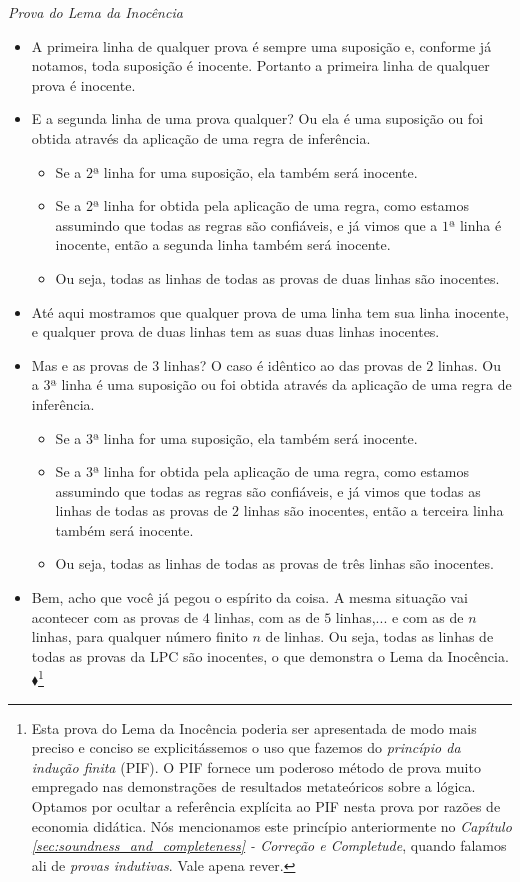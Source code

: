 	
\emph{Prova do Lema da Inocência}
\begin{itemize}
	\item A primeira linha de qualquer prova é sempre uma suposição e, conforme já notamos, toda suposição é inocente. Portanto a primeira linha de qualquer prova é inocente.
	\item E a segunda linha de uma prova qualquer? Ou ela é uma suposição ou foi obtida através da aplicação de uma regra de inferência.
		\begin{itemize} 
			\item Se a $2$ª linha for uma suposição, ela também será inocente.
			\item Se a $2$ª linha for obtida pela aplicação de uma regra, como estamos assumindo que todas as regras são confiáveis, e já vimos que a $1$ª linha é inocente, então a segunda linha também será inocente.
			\item Ou seja, todas as linhas de todas as provas de duas linhas são inocentes.
		\end{itemize}
	\item Até aqui mostramos que qualquer prova de uma linha tem sua linha inocente, e qualquer prova de duas linhas tem as suas duas linhas inocentes.
	\item Mas e as provas de $3$ linhas? O caso é idêntico ao das provas de $2$ linhas. Ou a $3$ª linha é uma suposição ou foi obtida através da aplicação de uma regra de inferência.
		\begin{itemize} 
			\item Se a $3$ª linha for uma suposição, ela também será inocente.
			\item Se a $3$ª linha for obtida pela aplicação de uma regra, como estamos assumindo que todas as regras são confiáveis, e já vimos que todas as linhas de todas as provas de $2$ linhas são inocentes, então a terceira linha também será inocente.
			\item Ou seja, todas as linhas de todas as provas de três linhas são inocentes.
		\end{itemize}
	\item Bem, acho que você já pegou o espírito da coisa. A mesma situação vai acontecer com as provas de $4$ linhas, com as de $5$ linhas,... e com as de $n$ linhas, para qualquer número finito $n$ de linhas. Ou seja, todas as linhas de todas as provas da LPC são inocentes, o que demonstra o Lema da Inocência.$\blacklozenge$\footnote{
		Esta prova do Lema da Inocência poderia ser apresentada de modo mais preciso e conciso se explicitássemos o uso que fazemos do \textit{princípio da indução finita} (PIF). O PIF fornece um poderoso método de prova muito empregado nas demonstrações de resultados metateóricos sobre a lógica. Optamos por ocultar a referência explícita ao PIF nesta prova por razões de economia didática. Nós mencionamos este princípio anteriormente no \textit{Capítulo \ref{sec:soundness_and_completeness} - Correção e Completude}, quando falamos ali de \textit{provas indutivas}. Vale apena rever.}
\end{itemize}

